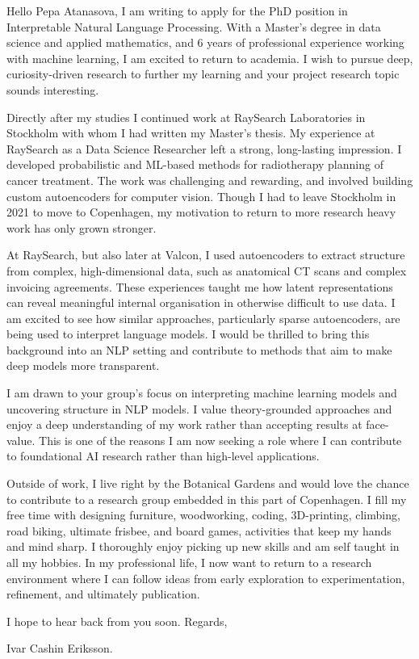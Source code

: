 \documentclass[11pt,a4paper]{moderncv}
\begin{document}
\makecvtitle
Hello Pepa Atanasova, I am writing to apply for the PhD position in Interpretable Natural Language Processing. With a Master's degree in data science and applied mathematics, and 6 years of professional experience working with machine learning, I am excited to return to academia. I wish to pursue deep, curiosity-driven research to further my learning and your project research topic sounds interesting. 

\hspace*{2em}
Directly after my studies I continued work at RaySearch Laboratories in Stockholm with whom I had written my Master's thesis. My experience at RaySearch as a Data Science Researcher left a strong, long-lasting impression. I developed probabilistic and ML-based methods for radiotherapy planning of cancer treatment. The work was challenging and rewarding, and involved building custom autoencoders for computer vision. Though I had to leave Stockholm in 2021 to move to Copenhagen, my motivation to return to more research heavy work has only grown stronger. 

\hspace*{2em}
At RaySearch, but also later at Valcon, I used autoencoders to extract structure from complex, high-dimensional data, such as anatomical CT scans and complex invoicing agreements. These experiences taught me how latent representations can reveal meaningful internal organisation in otherwise difficult to use data. I am excited to see how similar approaches, particularly sparse autoencoders, are being used to interpret language models. I would be thrilled to bring this background into an NLP setting and contribute to methods that aim to make deep models more transparent.

\hspace*{2em}
I am drawn to your group's focus on interpreting machine learning models and uncovering structure in NLP models. I value theory-grounded approaches and enjoy a deep understanding of my work rather than accepting results at face-value. This is one of the reasons I am now seeking a role where I can contribute to foundational AI research rather than high-level applications.

\hspace*{2em}
Outside of work, I live right by the Botanical Gardens and would love the chance to contribute to a research group embedded in this part of Copenhagen. I fill my free time with designing furniture, woodworking,  coding, 3D-printing, climbing, road biking, ultimate frisbee, and board games, activities that keep my hands and mind sharp. I thoroughly enjoy picking up new skills and am self taught in all my hobbies. In my professional life, I now want to return to a research environment where I can follow ideas from early exploration to experimentation, refinement, and ultimately publication.

\vspace{8 mm}
I hope to hear back from you soon. Regards, 

\vspace{3 mm} 
Ivar Cashin Eriksson.
\end{document}
